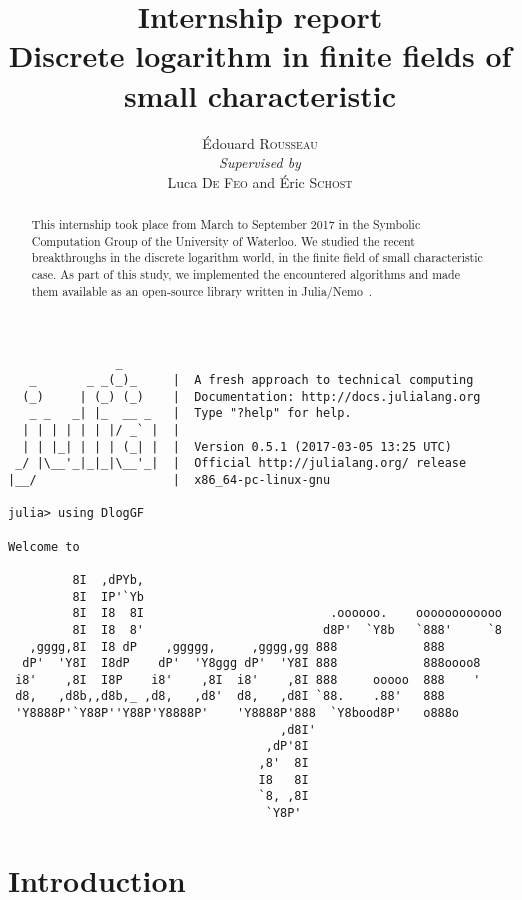 \documentclass[a4paper,11pt]{article}
\title{Internship report\\\textbf{Discrete logarithm in finite fields of
small characteristic}}
\author{Édouard \textsc{Rousseau}\\\textit{Supervised by}\\Luca
\textsc{De Feo} and Éric \textsc{Schost}}
\theoremstyle{break}
\theoremstyle{sc}
\theoremstyle{definition}
\theoremstyle{remark}
\begin{document}
\maketitle
\begin{verbatim}
               _
   _       _ _(_)_     |  A fresh approach to technical computing
  (_)     | (_) (_)    |  Documentation: http://docs.julialang.org
   _ _   _| |_  __ _   |  Type "?help" for help.
  | | | | | | |/ _` |  |
  | | |_| | | | (_| |  |  Version 0.5.1 (2017-03-05 13:25 UTC)
 _/ |\__'_|_|_|\__'_|  |  Official http://julialang.org/ release
|__/                   |  x86_64-pc-linux-gnu

julia> using DlogGF

Welcome to

         8I  ,dPYb,                       
         8I  IP'`Yb                        
         8I  I8  8I                          .oooooo.    oooooooooooo   
         8I  I8  8'                         d8P'  `Y8b   `888'     `8  
   ,gggg,8I  I8 dP    ,ggggg,     ,gggg,gg 888            888         
  dP'  'Y8I  I8dP    dP'  'Y8ggg dP'  'Y8I 888            888oooo8     
 i8'    ,8I  I8P    i8'    ,8I  i8'    ,8I 888     ooooo  888    '     
 d8,   ,d8b,,d8b,_ ,d8,   ,d8'  d8,   ,d8I `88.    .88'   888           
 'Y8888P'`Y88P''Y88P'Y8888P'    'Y8888P'888  `Y8bood8P'   o888o           
                                      ,d8I'                              
                                    ,dP'8I                               
                                   ,8'  8I                               
                                   I8   8I                               
                                   `8, ,8I                               
                                    `Y8P'                             
\end{verbatim}
\clearpage
\begin{abstract}
This internship took place from March to September 2017 in the Symbolic
Computation Group of the University of Waterloo. We studied the recent
breakthroughs in the discrete logarithm world, in the finite field of small characteristic case.
As part of this study, we implemented the encountered algorithms and made them
available as an open-source library written in Julia/Nemo~\cite{Julia, Nemo}.
\end{abstract}

\tableofcontents
\clearpage

\section{Introduction}
\end{document}
